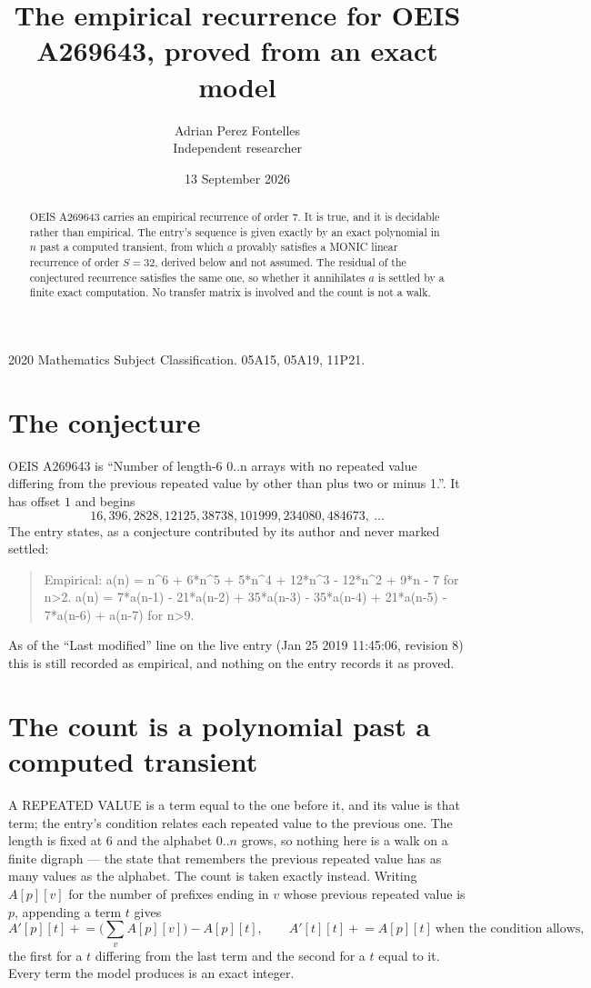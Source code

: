 \documentclass[11pt,a4paper]{article}
\title{The empirical recurrence for OEIS A269643, proved from an exact model}
\author{Adrian Perez Fontelles\\ \small Independent researcher}
\date{13 September 2026}
\theoremstyle{plain}
\theoremstyle{definition}
\begin{document}
\maketitle

\begin{abstract}
OEIS A269643 carries an empirical recurrence of order $7$. It is true, and it is
decidable rather than empirical. The entry's sequence is given exactly by an exact polynomial in $n$ past a computed transient, from
which $a$ provably satisfies a MONIC linear recurrence of order $S=32$, derived below and not
assumed. The residual of the conjectured recurrence satisfies the same one, so whether it
annihilates $a$ is settled by a finite exact computation. No transfer matrix is involved and
the count is not a walk.
\end{abstract}

\noindent\small 2020 Mathematics Subject Classification. 05A15, 05A19, 11P21.\normalsize

\section{The conjecture}

OEIS A269643 is ``Number of length-6 0..n arrays with no repeated value differing from the previous repeated value by other than plus two or minus 1.''. It has offset $1$ and begins
\[
16, 396, 2828, 12125, 38738, 101999, 234080, 484673,\ \dots
\]
The entry states, as a conjecture contributed by its author and never marked settled:
\begin{quote}
Empirical: a(n) = n\^{}6 + 6*n\^{}5 + 5*n\^{}4 + 12*n\^{}3 - 12*n\^{}2 + 9*n - 7 for n>2. a(n) = 7*a(n-1) - 21*a(n-2) + 35*a(n-3) - 35*a(n-4) + 21*a(n-5) - 7*a(n-6) + a(n-7) for n>9.
\end{quote}
As of the ``Last modified'' line on the live entry (Jan 25 2019 11:45:06, revision 8)
this is still recorded as empirical, and nothing on the entry records it as proved.

\section{The count is a polynomial past a computed transient}

A REPEATED VALUE is a term equal to the one before it, and its value is that term; the entry's
condition relates each repeated value to the previous one. The length is fixed at $6$ and the
alphabet $0..n$ grows, so nothing here is a walk on a finite digraph --- the state that
remembers the previous repeated value has as many values as the alphabet. The count is taken
exactly instead. Writing $A[p][v]$ for the number of prefixes ending in $v$ whose previous
repeated value is $p$, appending a term $t$ gives
\[
A'[p][t] \mathrel{+}= \Big(\sum_v A[p][v]\Big) - A[p][t],
\qquad
A'[t][t] \mathrel{+}= A[p][t]\ \text{when the condition allows},
\]
the first for a $t$ differing from the last term and the second for a $t$ equal to it. Every
term the model produces is an exact integer.
\end{document}
